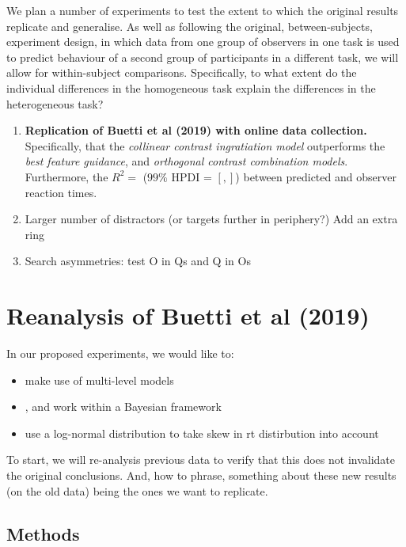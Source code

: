 We plan a number of experiments to test the extent to which the original results replicate and generalise. As well as following the original, between-subjects, experiment design, in which data from one group of observers in one task is used to predict behaviour of a second group of participants in a different task, we will allow for within-subject comparisons. Specifically, to what extent do the individual differences in the homogeneous task explain the differences in the heterogeneous task? 

\begin{enumerate}
\item \textbf{Replication of Buetti et al (2019) with online data collection.} Specifically, that the \textit{collinear contrast ingratiation model} outperforms the \textit{best feature guidance}, and \textit{orthogonal contrast combination models}.  Furthermore, the $R^2 = $ ($99\%$ HPDI = $[, ]$) between predicted and observer reaction times.\\
\item Larger number of distractors (or targets further in periphery?) Add an extra ring \\ 
\item Search asymmetries: test O in Qs and Q in Os \\
\end{enumerate}

\section{Reanalysis of Buetti et al (2019)}

In our proposed experiments, we would like to:
\begin{itemize} 
\item make use of multi-level models \\
\item, and work within a Bayesian framework \\
\item use a log-normal distribution to take skew in rt distirbution into account \\
\end{itemize}

To start, we will re-analysis previous data to verify that this does not invalidate the original conclusions. And, how to phrase, something about these new results (on the old data) being the ones we want to replicate. 

\subsection{Methods}

